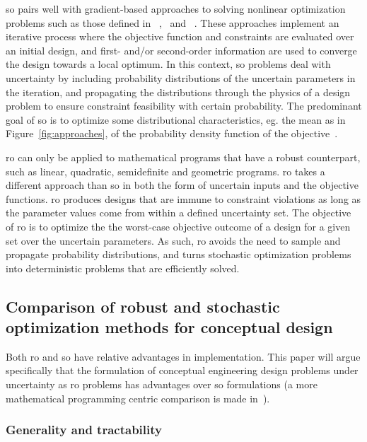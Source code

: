 {\gls{so} pairs well with gradient-based approaches to solving nonlinear optimization problems
such as those defined in ~\cite{Gallard2013},~\cite{Liem2015} and ~\cite{Liem2017}.
These approaches implement an iterative process where
the objective function and constraints are evaluated over an initial design, and first- and/or
second-order information are used to converge the design towards a local optimum.
In this context, \gls{so} problems deal with uncertainty by including
probability distributions of the uncertain parameters in the iteration, and propagating
the distributions through the physics of a design problem to ensure constraint feasibility with certain probability.
The predominant goal of \gls{so} is to optimize some distributional
characteristics, eg. the mean as in Figure~\ref{fig:approaches},
of the probability density function of the objective~\cite{Diwekar2008}.

\gls{ro} can only be applied to mathematical programs that have a robust counterpart,
such as linear, quadratic, semidefinite and geometric programs.
\gls{ro} takes a different approach than \gls{so} in both the form
of uncertain inputs and the objective functions. \gls{ro} produces designs that are
immune to constraint violations as long as the parameter values come from within a defined
uncertainty set. The objective of \gls{ro} is to optimize the
the worst-case objective outcome of a design for a
given set over the uncertain parameters. As such,
\gls{ro} avoids the need to sample and propagate probability
distributions, and turns stochastic optimization problems into
deterministic problems that are efficiently solved.}

\subsection{Comparison of robust and stochastic optimization methods for conceptual design}
\label{sec:robustvsstochastic}

Both \gls{ro} and \gls{so} have relative advantages in implementation. This paper will
argue specifically that the formulation of conceptual engineering design problems under uncertainty as
\gls{ro} problems has advantages over \gls{so} formulations (a more
mathematical programming centric comparison is made in~\cite{Bertsimas2011}).

\subsubsection{Generality and tractability}

